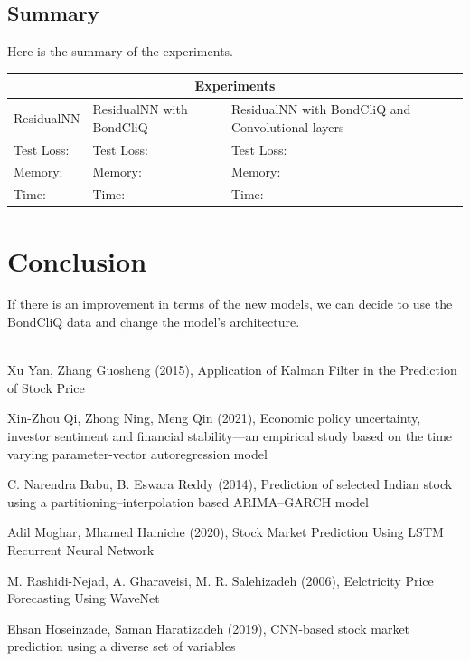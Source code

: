 \documentclass{article}
\begin{document}
\subsection{Summary}

Here is the summary of the experiments.\\

\begin{tabular}{ |p{2.5cm}|p{5cm}|p{5cm}|  }
\hline
\multicolumn{3}{|c|}{Experiments} \\
\hline
ResidualNN & ResidualNN with BondCliQ & ResidualNN with BondCliQ and Convolutional layers \\
\hline
Test Loss: & Test Loss: & Test Loss: \\
Memory: & Memory: & Memory: \\
Time: & Time: & Time: \\
\hline
\end{tabular}

\section{Conclusion}

If there is an improvement in terms of the new models, we can decide to use the BondCliQ data and change the model's architecture.\\

\\
\begin{thebibliography}{9}

Xu Yan, Zhang Guosheng (2015), Application of Kalman Filter in the Prediction of Stock Price

Xin-Zhou Qi, Zhong Ning, Meng Qin  (2021), Economic policy uncertainty, investor sentiment and financial stability—an empirical study based on the time varying parameter-vector autoregression model

C. Narendra Babu, B. Eswara Reddy  (2014), Prediction of selected Indian stock using a partitioning–interpolation based ARIMA–GARCH model

Adil Moghar, Mhamed Hamiche  (2020), Stock Market Prediction Using LSTM Recurrent Neural Network

M. Rashidi-Nejad, A. Gharaveisi, M. R. Salehizadeh  (2006), Eelctricity Price Forecasting Using WaveNet

Ehsan Hoseinzade, Saman Haratizadeh  (2019), CNN-based stock market prediction using a diverse set of variables

\end{thebibliography}
\end{document}
